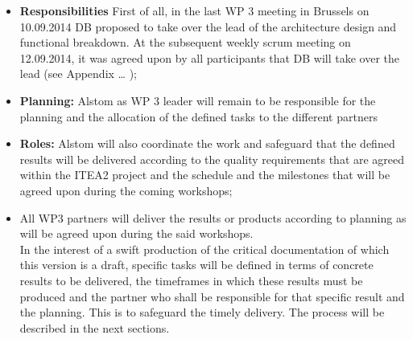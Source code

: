 \begin{itemize}
\item\textbf{Responsibilities} First of all, in the last WP 3 meeting in Brussels on  10.09.2014 DB proposed to take over the lead of the architecture design and functional breakdown. At the subsequent weekly scrum meeting on 12.09.2014,  it was agreed upon by all participants that DB will take over the lead (see Appendix … );\\
\item\textbf{Planning:} Alstom as WP 3 leader will remain to be responsible for the planning and the allocation of the defined tasks to the different partners\\
\item\textbf{Roles:} Alstom will also coordinate the work and safeguard that the defined results will be delivered according to the quality requirements that are agreed within the ITEA2 project and the schedule and the milestones that will be agreed upon during the coming workshops;\\
\item All WP3 partners will deliver the results or products according to planning as will be agreed upon during the said workshops. \\

In the interest of a swift production of the critical documentation of which this version is a draft, specific tasks will be defined in terms of concrete results to be delivered, the timeframes in which these results must be produced and the partner who shall be responsible for that specific result and the planning. This is to safeguard the timely delivery. The process will be described in the next sections.\\
\end{itemize}



